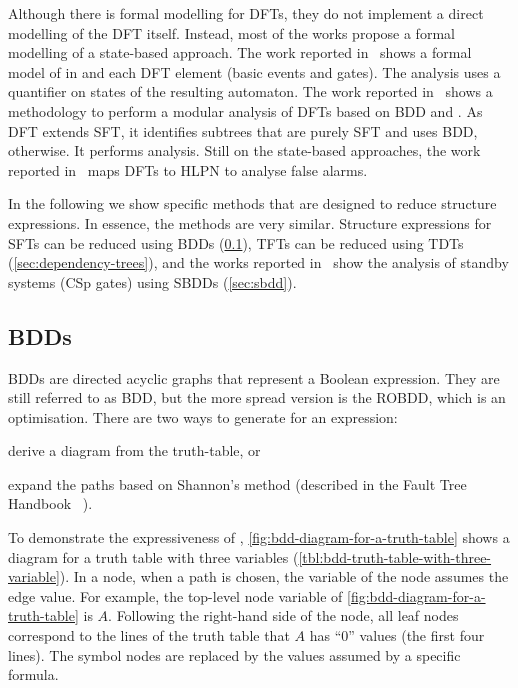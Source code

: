 \documentclass[12pt,openright,twoside,a4paper,oldfontcommands,english,brazil,draft]{abntex2}
\theoremstyle{theo}
\def\FThandbook{Fault Tree Handbook~\cite{VGR+1981}\index{Fault Tree!Handbook}%
  \gdef\FThandbook{Fault Tree Handbook\index{Fault Tree!Handbook}\xspace}%
  \xspace}
\begin{document}
Although there is formal modelling for \acp{DFT}, they do not implement a direct modelling of the \ac{DFT} itself.
Instead, most of the works propose a formal modelling of a state-based approach.
The work reported in~\cite{CSD2000} shows a formal model of  in  and each \ac{DFT} element (basic events and gates).
The analysis uses a quantifier on states of the resulting  automaton.
The work reported in~\cite{GD1997} shows a methodology to perform a modular analysis of \acp{DFT} based on \ac{BDD} and .
As \ac{DFT} extends \ac{SFT}, it identifies subtrees that are purely \ac{SFT} and uses \ac{BDD}, otherwise.
It performs  analysis.
Still on the state-based approaches, the work reported in~\cite{SLD2011} maps \acp{DFT} to \ac{HLPN} to analyse false alarms.


In the following we show specific methods that are designed to reduce structure expressions.
In essence, the methods are very similar.
Structure expressions for \acp{SFT} can be reduced using \acp{BDD} (\cref{sec:bdd}), \acp{TFT} can be reduced using \acp{TDT} (\cref{sec:dependency-trees}), and the works reported in~\cite{TXD2011,XTD2012} show the analysis of standby systems (\ac{CSp} gates) using \acp{SBDD} (\cref{sec:sbdd}).

\subsection{\Aclp*{BDD}}
\label{sec:bdd}

\Acp{BDD} are directed acyclic graphs that represent a Boolean expression.
They are still referred to as \ac{BDD}, but the more spread version is the \ac{ROBDD}, which is an optimisation.
There are two ways to generate  for an expression:
\begin{alineasinline}
  \item derive a diagram from the truth-table, or
  \item expand the paths based on Shannon's method (described in the \FThandbook).
\end{alineasinline}

To demonstrate the expressiveness of , \cref{fig:bdd-diagram-for-a-truth-table} shows a diagram for a truth table with three variables (\cref{tbl:bdd-truth-table-with-three-variable}).
In a node, when a path is chosen, the variable of the node assumes the edge value.
For example, the top-level node variable of \cref{fig:bdd-diagram-for-a-truth-table} is $A$.
Following the right-hand side of the node, all leaf nodes correspond to the lines of the truth table that $A$ has ``0'' values (the first four lines).
The symbol nodes are replaced by the values assumed by a specific formula.
\end{document}
